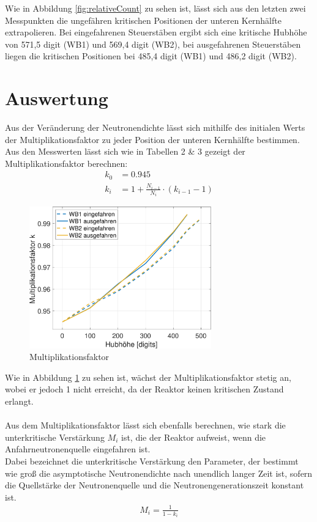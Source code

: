 \documentclass[12pt,german]{article}
\begin{document}
    Wie in Abbildung \ref{fig:relativeCount} zu sehen ist, lässt sich aus den letzten zwei Messpunkten die ungefähren kritischen Positionen der unteren Kernhälfte extrapolieren.
    Bei eingefahrenen Steuerstäben ergibt sich eine kritische Hubhöhe von 571,5 digit (WB1) und 569,4 digit (WB2), bei ausgefahrenen Steuerstäben liegen die kritischen Positionen bei 485,4 digit (WB1) und 486,2 digit (WB2).

    \section{Auswertung}


    Aus der Veränderung der Neutronendichte lässt sich mithilfe des initialen Werts der Multiplikationsfaktor zu jeder Position der unteren Kernhälfte bestimmen. \\
    Aus den Messwerten lässt sich wie in Tabellen 2 \& 3 gezeigt der Multiplikationsfaktor berechnen:
    \begin{align*}
        k_0 &= 0.945 \\
        k_i &= 1 + \frac{N_{i-1}}{N_i} \cdot \left(k_{i-1} - 1\right)
    \end{align*}
    
    \begin{figure}[H]
        \centering
        \includegraphics[width=0.7\textwidth]{multiplikationsfaktor.png}
        \caption{Multiplikationsfaktor}
        \label{fig:multFaktor}
    \end{figure}
    Wie in Abbildung \ref{fig:multFaktor} zu sehen ist, wächst der Multiplikationsfaktor stetig an, wobei er jedoch 1 nicht erreicht, da der Reaktor keinen kritischen Zustand erlangt.
    \\ \\
    Aus dem Multiplikationsfaktor lässt sich ebenfalls berechnen, wie stark die unterkritische Verstärkung $M_i$ ist, die der Reaktor aufweist, wenn die Anfahrneutronenquelle eingefahren ist. \\
    Dabei bezeichnet die unterkritische Verstärkung den Parameter, der bestimmt wie groß die asymptotische Neutronendichte nach unendlich langer Zeit ist, sofern die Quellstärke der Neutronenquelle und die Neutronengenerationszeit konstant ist.
    \begin{align*}
        M_i = \frac{1}{1 - k_i}
    \end{align*}
\end{document}
